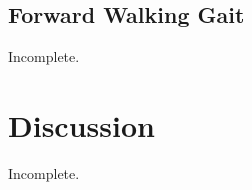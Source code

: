 \subsection{Forward Walking Gait} %
\label{sub:forward_walking_gait}
Incomplete. 


\section{Discussion} %
\label{sec:discussion}
Incomplete. 

